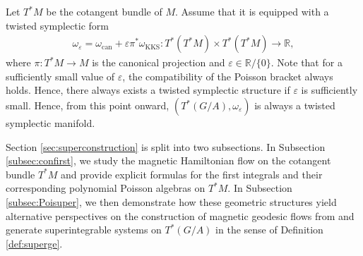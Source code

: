 \documentclass[11pt]{amsart}
\theoremstyle{definition}
\theoremstyle{plain}
\theoremstyle{conclusion}
\begin{document}
Let $ T^*M$ be the cotangent bundle of $M$. Assume that it is equipped with a twisted symplectic form \begin{align}
  \omega_\varepsilon = \omega_{\mathrm{can}} +  \varepsilon\pi^*\omega_{\mathrm{KKS}}: T^*(T^*M) \times T^*(T^*M) \rightarrow \mathbb{R},  
\end{align} where $\pi: T^*M \rightarrow M$ is the canonical projection and $\varepsilon \in \mathbb{R}/\{0\}$. Note that for a sufficiently small value of $\varepsilon$, the compatibility of the Poisson bracket always holds. Hence, there always exists a twisted symplectic structure if $\varepsilon$ is sufficiently small. Hence, from this point onward, $(T^*(G/A),\omega_\varepsilon)$ is always a twisted symplectic manifold.

Section \ref{sec:superconstruction} is split into two subsections. In Subsection \ref{subsec:confirst}, we study the magnetic Hamiltonian flow on the cotangent bundle $T^*M$ and provide explicit formulas for the first integrals and their corresponding polynomial Poisson algebras on $T^*M$. In Subsection \ref{subsec:Poisuper}, we then demonstrate how these geometric structures yield alternative perspectives on the construction of magnetic geodesic flows from \cite{MR2141306} and generate superintegrable systems on $T^*(G/A)$ in the sense of Definition \eqref{def:superge}.   
 
\end{document}
